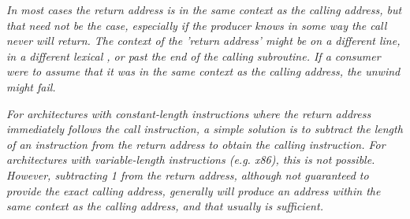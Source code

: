 \textit{In most cases the return address is in the same context as the
calling address, but that need not be the case, especially if
the producer knows in some way the call never will return. The
context of the 'return address' might be on a different line,
in a different lexical , 
or past the end of the calling
subroutine. If a consumer were to assume that it was in the
same context as the calling address, the unwind might fail.}

\textit{For architectures with constant-length instructions where
the return address immediately follows the call instruction,
a simple solution is to subtract the length of an instruction
from the return address to obtain the calling instruction. For
architectures with variable-length instructions (e.g.  x86),
this is not possible. However, subtracting 1 from the return
address, although not guaranteed to provide the exact calling
address, generally will produce an address within the same
context as the calling address, and that usually is sufficient.}



